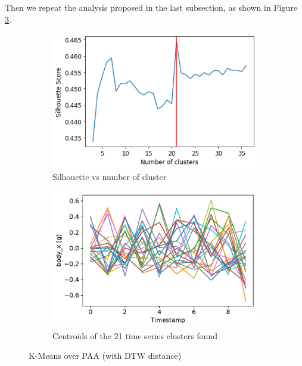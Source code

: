 \documentclass[10pt, a4paper, twocolumn]{article}
\begin{document}
Then we repeat the analysis proposed in the last subsection, as shown in Figure \ref{fig:kmeanspaa}.

\begin{figure}
    \centering
    \begin{subfigure}[t]{0.49\columnwidth}
    \includegraphics[width=\linewidth]{KMeans_PAA_silhouette.png}
    \caption{Silhouette vs number of cluster}
    \label{fig:silpaa}
    \end{subfigure}
    \begin{subfigure}[t]{0.49\columnwidth}
    \includegraphics[width=\linewidth]{X_PAA_21_cluster.pdf}
    \caption{Centroids of the 21 time series clusters found}
    \label{fig:21cl}
    \end{subfigure}
    \caption{K-Means over PAA (with DTW distance)}
    \label{fig:kmeanspaa}
\end{figure}
\end{document}
